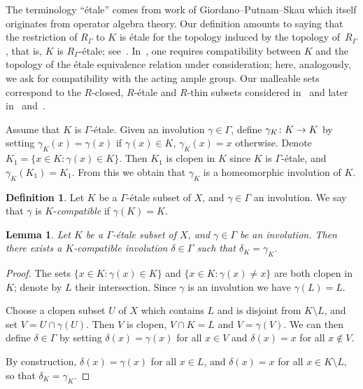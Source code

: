 \documentclass[10pt,a4paper]{article}
\newtheorem{lemm}[theo]{Lemma}
\theoremstyle{definition}
\newtheorem{defi}[theo]{Definition}
\renewcommand*{\to}{\mathchoice{\longrightarrow}{\rightarrow}{\rightarrow}{\rightarrow}}
\begin{document}
The terminology ``étale'' comes from work of Giordano--Putnam--Skau which itself originates from operator algebra theory. Our definition amounts to saying that the restriction of $R_\Gamma$ to $K$ is étale for the topology induced by the topology of~$R_\Gamma$, that is, $K$ is $R_\Gamma$-étale; see~\cite[Definition~2.1]{Giordano2004}. In~\cite{Giordano2004}, one requires compatibility between $K$ and the topology of the étale equivalence relation under consideration; here, analogously, we ask for compatibility with the acting ample group. Our malleable sets correspond to the $R$-closed, $R$-étale and $R$-thin subsets considered in~\cite{Giordano2004} and later in~\cite{Giordano2008} and~\cite{Matui2008}.

Assume that $K$ is $\Gamma$-étale. Given an involution $\gamma \in \Gamma$, define $\gamma_K \colon K \to K$ by setting $\gamma_K(x)= \gamma(x)$ if $\gamma(x) \in K$, $\gamma_K(x)=x$ otherwise. Denote $K_1= \{x \in K : \gamma(x) \in K\}$. Then $K_1$ is clopen in $K$ since $K$ is $\Gamma$-étale, and $\gamma_K(K_1)= K_1$. From this we obtain that $\gamma_K$ is a homeomorphic involution of $K$.

\begin{defi}
Let $K$ be a $\Gamma$-étale subset of $X$, and $\gamma \in \Gamma$ an involution. We say that $\gamma$ is $K$-\emph{compatible} if $\gamma(K)=K$.
\end{defi}

\begin{lemm}
Let $K$ be a $\Gamma$-étale subset of $X$, and $\gamma \in \Gamma$ be an involution. Then there exists a $K$-compatible involution $\delta \in \Gamma$ such that $\delta_K=\gamma_K$.
\end{lemm}

\begin{proof}
The sets $\{x \in K : \gamma(x) \in K \}$ and $\{x \in K : \gamma(x) \ne x\}$ are both clopen in $K$; denote by $L$ their intersection. Since $\gamma$ is an involution we have $\gamma(L)=L$.

Choose a clopen subset $U$ of $X$ which contains $L$ and is disjoint from $K\setminus L$, and set $V=U \cap \gamma(U)$. Then $V$ is clopen, $V \cap K=L$ and $V= \gamma (V)$. We can then define $\delta \in \Gamma$ by setting $\delta(x)=\gamma(x)$ for all $x \in V$ and $\delta(x)=x$ for all $x \not \in V$.

By construction, $\delta(x)=\gamma(x)$ for all $x \in L$, and $\delta(x)=x$ for all $x \in K \setminus L$, so that $\delta_K=\gamma_K$.
\end{proof}
\end{document}
